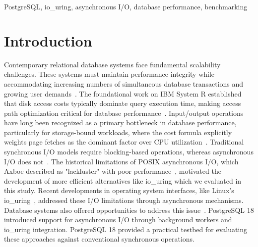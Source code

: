 \documentclass[conference]{IEEEtran}
\begin{document}
\begin{IEEEkeywords}
 PostgreSQL, io\_uring, asynchronous I/O, database performance, benchmarking
\end{IEEEkeywords}



\section{Introduction}
\label{sec:Introduction}

Contemporary relational database systems face fundamental scalability challenges. These systems must maintain performance integrity while accommodating increasing numbers of simultaneous database transactions and growing user demands~\cite{silva_towards_2015}.
The foundational work on IBM System R established that disk access costs typically dominate query execution time, making access path optimization critical for database performance~\cite{selinger_access_1979}.
Input/output operations have long been recognized as a primary bottleneck in database performance, particularly for storage-bound workloads, where the cost formula explicitly weights page fetches as the dominant factor over CPU utilization~\cite{selinger_access_1979}.
Traditional synchronous I/O models require blocking-based operations, whereas asynchronous I/O does not~\cite{pestka2024aio}. 
The historical limitations of POSIX asynchronous I/O, which Axboe described as "lackluster"  with poor performance~\cite{axboe2019io_uring}, motivated the development of more efficient alternatives like io\_uring which we evaluated in this study.
Recent developments in operating system interfaces, like Linux's io\_uring~\cite{An2024A2L}, addressed these I/O limitations through asynchronous mechanisms. Database systems also offered opportunities to address this issue~\cite{do_need_1999}.
PostgreSQL 18 introduced support for asynchronous I/O through background workers and io\_uring integration. PostgreSQL 18 provided a practical testbed for evaluating these approaches against conventional synchronous operations. %
\end{document}
